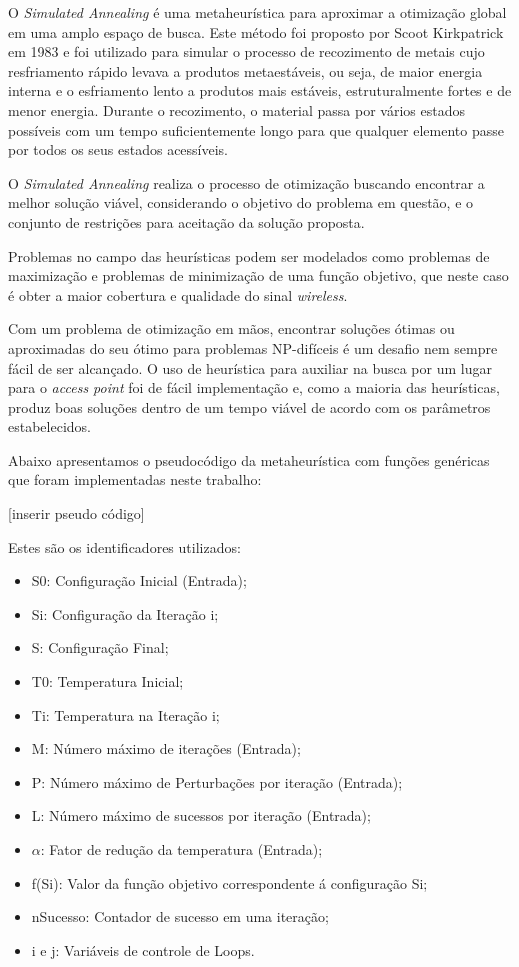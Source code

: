\documentclass[
	12pt,				%
	openright,			%
	twoside,			%
	a4paper,			%
	english,			%
	french,				%
	spanish,			%
	brazil				%
	]{abntex2}
\begin{document}
O \textit{Simulated Annealing} é uma metaheurística para aproximar a otimização global em uma amplo espaço de busca. Este método foi proposto por Scoot Kirkpatrick em 1983 e foi utilizado para simular o processo de recozimento de metais cujo resfriamento  rápido levava a produtos metaestáveis, ou seja, de maior energia interna e o esfriamento lento a produtos mais estáveis, estruturalmente fortes e de menor energia. Durante o recozimento, o material passa por vários estados possíveis com um tempo suficientemente longo para que qualquer elemento passe por todos os seus estados acessíveis.

O \textit{Simulated Annealing} realiza o processo de otimização buscando encontrar a melhor solução viável, considerando o objetivo do problema em questão, e o conjunto de restrições para aceitação da solução proposta.

Problemas no campo das heurísticas podem ser modelados como problemas de maximização e problemas de minimização de uma função objetivo, que neste caso é obter a maior cobertura e qualidade do sinal \textit{wireless}.

Com um problema de otimização em mãos, encontrar soluções ótimas ou aproximadas do seu ótimo para problemas NP-difíceis é um desafio nem sempre fácil de ser alcançado. O uso de heurística para auxiliar na busca por um lugar para o \textit{access point} foi de fácil implementação e, como a maioria das heurísticas, produz boas soluções dentro de um tempo viável de acordo com os parâmetros estabelecidos.

Abaixo apresentamos o pseudocódigo da metaheurística com funções genéricas que foram implementadas neste trabalho:

[inserir pseudo código]

Estes são os identificadores utilizados:

\begin{itemize}
	\item S0: Configuração Inicial (Entrada);
	\item Si: Configuração da Iteração i;
	\item S: Configuração Final;
	\item T0: Temperatura Inicial;
	\item Ti: Temperatura na Iteração i;
	\item M: Número máximo de iterações (Entrada);
	\item P: Número máximo de Perturbações por iteração (Entrada);
	\item L: Número máximo de sucessos por iteração (Entrada);
	\item $ \alpha $: Fator de redução da temperatura (Entrada);
	\item f(Si): Valor da função objetivo correspondente á configuração Si;
	\item nSucesso: Contador de sucesso em uma iteração;
	\item i e j: Variáveis de controle de Loops.
\end{itemize}
\end{document}
